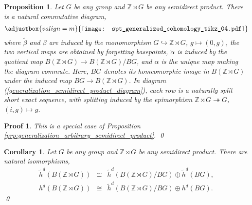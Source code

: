 \documentclass[sort&compress]{elsarticle}
\theoremstyle{theoremstyle}
\newtheorem{prp}[nul]{Proposition}
\newtheorem{cor}[nul]{Corollary}
\theoremstyle{framedtheoremstyle}
\theoremstyle{definitionstyle}
\theoremstyle{definitionstyle}
\theoremstyle{definitionstyle}
\theoremstyle{definitionstyle}
\theoremstyle{nameddefinitionstyle}
\theoremstyle{framednameddefinitionstyle}
\theoremstyle{proofstyle}
\newtheorem{pf}{Proof}
\theoremstyle{definitionstyle}
\newcommand{\fromto}{\rightarrow}
\newcommand{\oneone}{\hookrightarrow}
\newcommand{\onto}{\twoheadrightarrow}
\newcommand{\ZZZ}{\mathbb{Z}}
\newcommand{\isomorphic}{\cong}
\newcommand{\paren}[1]{\left( #1 \right)}
\begin{document}
\begin{appendices}

\begin{prp}\label{prp:generalization_semidirect_product}
Let $G$ be any group and $\ZZZ \rtimes G$ be any semidirect product. There is a natural commutative diagram,
\begin{eqnarray}
\adjustbox{valign=m}{\texttt{[image: spt\_generalized\_cohomology\_tikz\_04.pdf]}}
\label{generalization_semidirect_product_diagram}
\end{eqnarray}
where $\tilde \beta$ and $\beta$ are induced by the monomorphism $G \oneone \ZZZ\rtimes G$, $g\mapsto (0,g)$, the two vertical maps are obtained by forgetting basepoints, $\tilde \alpha$ is induced by the quotient map $B\paren{\ZZZ\rtimes G} \fromto B\paren{\ZZZ \rtimes G}/ BG$, and $\alpha$ is the unique map making the diagram commute. Here, $BG$ denotes its homeomorphic image in $B\paren{\ZZZ \rtimes G}$ under the induced map $BG \fromto B\paren{\ZZZ\rtimes G}$. In diagram (\ref{generalization_semidirect_product_diagram}), each row is a naturally split short exact sequence, with splitting induced by the epimorphism $\ZZZ \rtimes G \onto G$, $(i,g) \mapsto g$.
\end{prp}

\begin{pf}%
This is a special case of Proposition \ref{prp:generalization_arbitrary_semidirect_product}.
\qed\end{pf}


\begin{cor}\label{cor:generalization_semidirect_product}
Let $G$ be any group and $\ZZZ \rtimes G$ be any semidirect product. There are natural isomorphisms,
\begin{eqnarray}
\tilde h^d\paren{ B(\ZZZ\rtimes G) } &\isomorphic& \tilde h^{d}\paren{ B\paren{\ZZZ \rtimes G} / BG } \oplus \tilde h^d\paren{BG}, \\
h^d\paren{ B(\ZZZ\rtimes G) } &\isomorphic& \tilde h^{d}\paren{ B\paren{\ZZZ \rtimes G} / BG } \oplus h^d\paren{BG}.
\end{eqnarray}\qed
\end{cor}






\end{appendices}
\end{document}
